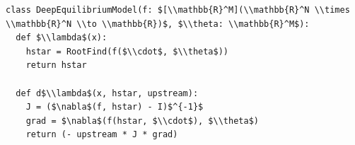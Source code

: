 \documentclass[border=10pt]{standalone}
\begin{document}
\begin{lstlisting}
class DeepEquilibriumModel(f: $[\\mathbb{R}^M](\\mathbb{R}^N \\times \\mathbb{R}^N \\to \\mathbb{R})$, $\\theta: \\mathbb{R}^M$):
  def $\\lambda$(x):
    hstar = RootFind(f($\\cdot$, $\\theta$))
    return hstar

  def d$\\lambda$(x, hstar, upstream):
    J = ($\nabla$(f, hstar) - I)$^{-1}$
    grad = $\nabla$(f(hstar, $\\cdot$), $\\theta$)
    return (- upstream * J * grad)
\end{lstlisting}
\end{document}
